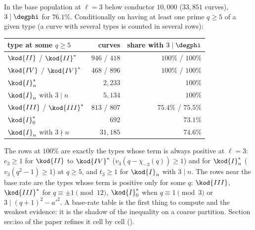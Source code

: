 \begin{sloppypar}
\begin{example}\label{ex:computation:base-rates}
In the base population at $\ell=3$ below conductor $10{,}000$ ($33{,}851$ curves), $3\mid\degphi$ for $76.1\%$. Conditionally on having at least one prime $q\ge5$
of a given type (a curve with several types is counted in several rows):
\begin{center}\small
\begin{tabular}{lrr}
\toprule
type at some $q\ge5$ & curves & share with $3\mid\degphi$\\
\midrule
$\kod{II}$ / $\kod{II}^*$ & $946$ / $418$ & $100\%$ / $100\%$\\
$\kod{IV}$ / $\kod{IV}^*$ & $468$ / $896$ & $100\%$ / $100\%$\\
$\kod{I}_n^*$ & $2{,}233$ & $100\%$\\
$\kod{I}_n$ with $3\mid n$ & $5{,}134$ & $100\%$\\
$\kod{III}$ / $\kod{III}^*$ & $813$ / $807$ & $75.4\%$ / $75.5\%$\\
$\kod{I}_0^*$ & $692$ & $73.1\%$\\
$\kod{I}_n$ with $3\nmid n$ & $31{,}185$ & $74.6\%$\\
\bottomrule
\end{tabular}
\end{center}
The rows at $100\%$ are exactly the types whose term is always positive at $\ell=3$: $e_3\ge1$ for $\kod{II}$ to $\kod{IV}^*$ ($v_3(q-\chi_{-3}(q))\ge1$) and for $\kod{I}_n^*$
($v_3(q^2-1)\ge1$) at $q\ge5$, and $t_3\ge1$ for $\kod{I}_n$ with $3\mid n$. The rows near the base rate are the types whose term is positive only for some $q$:
$\kod{III}$, $\kod{III}^*$ for $q\equiv\pm1\pmod{12}$, $\kod{I}_0^*$ when $q\equiv1\pmod3$ or $3\mid(q+1)^2-a'^2$. A base-rate table is the first thing to compute and
the weakest evidence: it is the shadow of the inequality on a coarse partition. Section sec:iso of the paper refines it cell by cell
().
\end{example}


\end{sloppypar}
